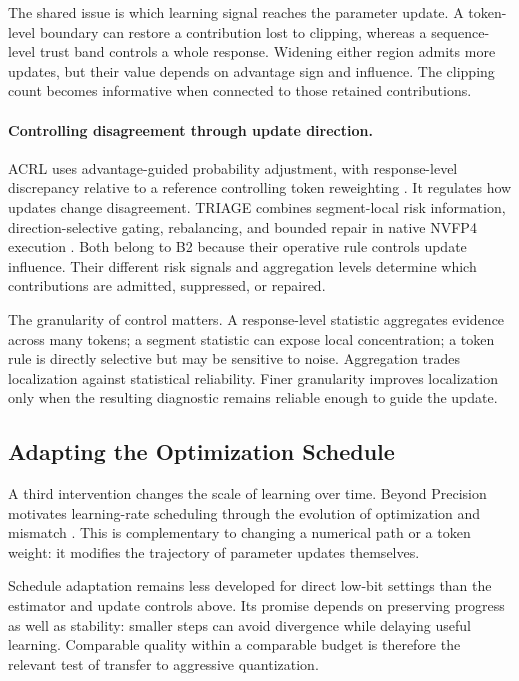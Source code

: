 The shared issue is which learning signal reaches the parameter update. A token-level boundary can restore a contribution lost to clipping, whereas a sequence-level trust band controls a whole response. Widening either region admits more updates, but their value depends on advantage sign and influence. The clipping count becomes informative when connected to those retained contributions.

\paragraph{Controlling disagreement through update direction.}
ACRL uses advantage-guided probability adjustment, with response-level discrepancy relative to a reference controlling token reweighting \citep{acrl}. It regulates how updates change disagreement. TRIAGE combines segment-local risk information, direction-selective gating, rebalancing, and bounded repair in native NVFP4 execution \citep{triage}. Both belong to B2 because their operative rule controls update influence. Their different risk signals and aggregation levels determine which contributions are admitted, suppressed, or repaired.

The granularity of control matters. A response-level statistic aggregates evidence across many tokens; a segment statistic can expose local concentration; a token rule is directly selective but may be sensitive to noise. Aggregation trades localization against statistical reliability. Finer granularity improves localization only when the resulting diagnostic remains reliable enough to guide the update.

\subsection{Adapting the Optimization Schedule}\label{sec:b3}
A third intervention changes the scale of learning over time. Beyond Precision motivates learning-rate scheduling through the evolution of optimization and mismatch \citep{beyond}. This is complementary to changing a numerical path or a token weight: it modifies the trajectory of parameter updates themselves.

Schedule adaptation remains less developed for direct low-bit settings than the estimator and update controls above. Its promise depends on preserving progress as well as stability: smaller steps can avoid divergence while delaying useful learning. Comparable quality within a comparable budget is therefore the relevant test of transfer to aggressive quantization.

